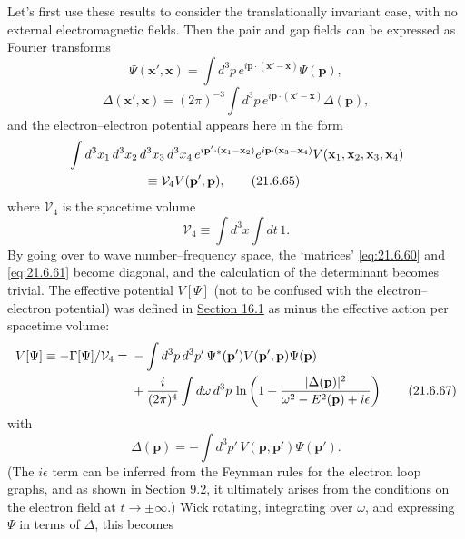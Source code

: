Let's first use these results to consider the translationally invariant case, with no external electromagnetic fields. Then the pair and gap fields can be expressed as Fourier transforms
\begin{equation}
\Psi(\mathbf x',\mathbf x)
=\int d^3p\,e^{i\mathbf p\cdot(\mathbf x'-\mathbf x)}\Psi(\mathbf p),
\tag{21.6.63}\label{eq:21.6.63}
\end{equation}
\begin{equation}
\Delta(\mathbf x',\mathbf x)
=(2\pi)^{-3}\int d^3p\,e^{i\mathbf p\cdot(\mathbf x'-\mathbf x)}
\Delta(\mathbf p),
\tag{21.6.64}\label{eq:21.6.64}
\end{equation}
and the electron--electron potential appears here in the form
\begin{align}
&\int d^3x_1\,d^3x_2\,d^3x_3\,d^3x_4\,
e^{i\mathbf p'\cdot(\mathbf x_1-\mathbf x_2)}
e^{i\mathbf p\cdot(\mathbf x_3-\mathbf x_4)}
V(\mathbf x_1,\mathbf x_2,\mathbf x_3,\mathbf x_4)
\notag\\
&\hspace{6em}\equiv\mathcal V_4 V(\mathbf p',\mathbf p),
\tag{21.6.65}\label{eq:21.6.65}
\end{align}
where $\mathcal V_4$ is the spacetime volume
\begin{equation}
\mathcal V_4\equiv\int d^3x\int dt\,1.
\tag{21.6.66}\label{eq:21.6.66}
\end{equation}
By going over to wave number--frequency space, the `matrices' \eqref{eq:21.6.60} and \eqref{eq:21.6.61} become diagonal, and the calculation of the determinant becomes trivial. The effective potential $V[\Psi]$ (not to be confused with the electron--electron potential) was defined in \hyperref[sec:16.1]{Section 16.1} as minus the effective action per spacetime volume:
\begin{align}
V[\Psi]\equiv-\Gamma[\Psi]/\mathcal V_4
={}&-\int d^3p\,d^3p'\,
\Psi^*(\mathbf p')V(\mathbf p',\mathbf p)\Psi(\mathbf p)
\notag\\
&+\frac{i}{(2\pi)^4}\int d\omega\,d^3p\,
\ln\left(
1+\frac{|\Delta(\mathbf p)|^2}
{\omega^2-E^2(\mathbf p)+i\epsilon}
\right)
\tag{21.6.67}\label{eq:21.6.67}
\end{align}
with
\begin{equation}
\Delta(\mathbf p)=-\int d^3p'\,
V(\mathbf p,\mathbf p')\Psi(\mathbf p').
\tag{21.6.68}\label{eq:21.6.68}
\end{equation}
(The $i\epsilon$ term can be inferred from the Feynman rules for the electron loop graphs, and as shown in \hyperref[sec:9.2]{Section 9.2}, it ultimately arises from the conditions on the electron field at $t\to\pm\infty$.) Wick rotating, integrating over $\omega$, and expressing $\Psi$ in terms of $\Delta$, this becomes
